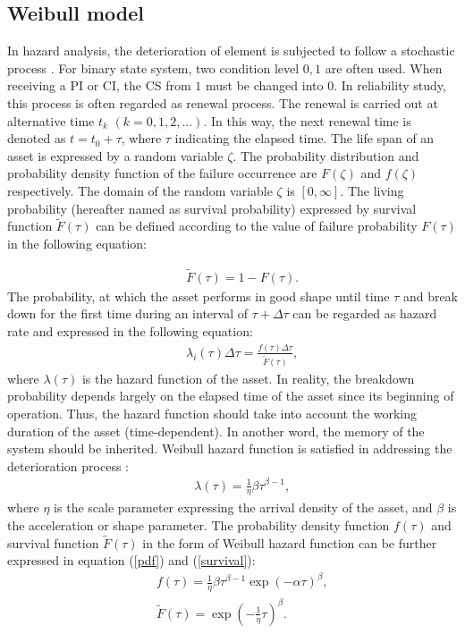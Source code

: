 \subsection{Weibull model} \label{ch03:weibullmodel}

In hazard analysis, the deterioration of element is subjected to follow a stochastic process \cite{lancaster90}. For binary state system, two condition level $0, 1$ are often used. When receiving a PI or CI, the CS from $1$ must be changed into $0$. In reliability study, this process is often regarded as renewal process. The renewal is carried out at alternative time $t_k$ $(k=0,1,2,...)$. In this way, the next renewal time is denoted as $t=t_0+\tau$, where $\tau$ indicating the elapsed time. The life span of an asset is expressed by a random variable $\zeta$. The probability distribution and probability density function of the failure occurrence are $F(\zeta)$ and $f(\zeta)$ respectively. The domain of the random variable $\zeta$ is $[0,\infty]$. The living probability (hereafter named as survival probability) expressed by survival function $\tilde{F}(\tau)$ can be defined according to the value of failure probability $F(\tau)$ in the following equation:

\begin{eqnarray}
&& \tilde{F}(\tau) = 1 - F(\tau). \label{funcbF5}
\end{eqnarray}
The probability, at which the asset performs in good shape until time $\tau$ and break down for the first time during an interval of $\tau+\Delta\tau$ can be regarded as hazard rate and expressed in the following equation:
\begin{eqnarray}
&& \lambda_i(\tau) \Delta \tau = \frac{f(\tau)\Delta \tau}{\tilde{F}(\tau)}, \label{riskbF5}
\end{eqnarray}
where $\lambda(\tau)$ is the hazard function of the asset. In reality, the breakdown probability depends largely on the elapsed time of the asset since its beginning of operation. Thus, the hazard function should take into account the working duration of the asset (time-dependent). In another word, the memory of the system should be inherited. Weibull hazard function is satisfied in addressing the deterioration process \cite{Dodson2006, Kobayashi2010a}:
\begin{eqnarray}
&& \lambda(\tau)= \frac{1}{\eta} \beta \tau^{\beta-1}, \label{weibul}
\end{eqnarray}
where $\eta$ is the scale parameter expressing the arrival density of the asset, and $\beta$ is the acceleration or shape parameter. The probability density function $f(\tau)$ and survival function $\tilde{F}(\tau)$ in the form of Weibull hazard function can be further expressed in equation (\ref{pdf}) and (\ref{survival}):
\begin{eqnarray}
&& f(\tau)=\frac{1}{\eta} \beta \tau^{\beta-1}\exp(-\alpha \tau)^{\beta}, \label{pdf} \\
&& \tilde{F}(\tau)=\exp(-\frac{1}{\eta} \tau)^{\beta}. \label{survival}
\end{eqnarray}

